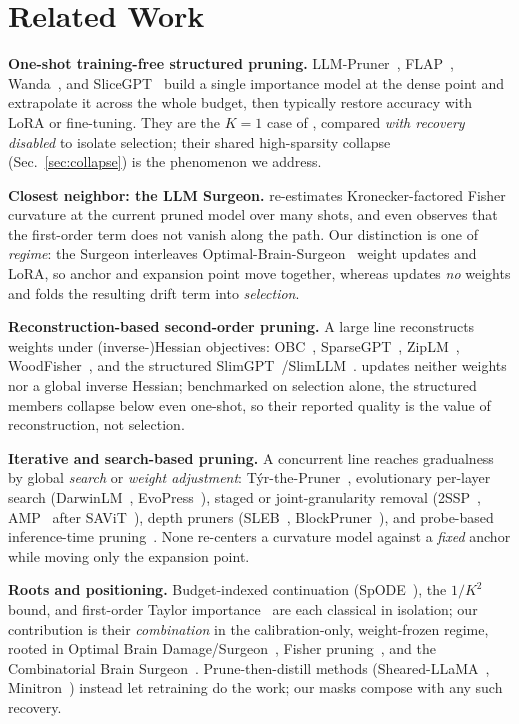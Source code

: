 \section{Related Work}
\label{sec:related}

\textbf{One-shot training-free structured pruning.}
LLM-Pruner~\citep{ma2023llmpruner}, FLAP~\citep{an2024flap}, Wanda~\citep{sun2024wanda}, and SliceGPT~\citep{ashkboos2024slicegpt} build a single importance model at the dense point and extrapolate it across the whole budget, then typically restore accuracy with LoRA or fine-tuning.
They are the $K{=}1$ case of \method, compared \emph{with recovery disabled} to isolate selection; their shared high-sparsity collapse (Sec.~\ref{sec:collapse}) is the phenomenon we address.

\textbf{Closest neighbor: the LLM Surgeon.}
\citet{ouderaa2024llmsurgeon} re-estimates Kronecker-factored Fisher curvature at the current pruned model over many shots, and even observes that the first-order term does not vanish along the path.
Our distinction is one of \emph{regime}: the Surgeon interleaves Optimal-Brain-Surgeon~\citep{hassibi1993obs} weight updates and LoRA, so anchor and expansion point move together, whereas \method updates \emph{no} weights and folds the resulting drift term into \emph{selection}.

\textbf{Reconstruction-based second-order pruning.}
A large line reconstructs weights under (inverse-)Hessian objectives: OBC~\citep{frantar2022obc}, SparseGPT~\citep{frantar2023sparsegpt}, ZipLM~\citep{kurtic2023ziplm}, WoodFisher~\citep{singh2020woodfisher}, and the structured SlimGPT~\citep{ling2024slimgpt}/SlimLLM~\citep{guo2025slimllm}.
\method updates neither weights nor a global inverse Hessian; benchmarked on selection alone, the structured members collapse below even one-shot, so their reported quality is the value of reconstruction, not selection.

\textbf{Iterative and search-based pruning.}
A concurrent line reaches gradualness by global \emph{search} or \emph{weight adjustment}: T\'yr-the-Pruner~\citep{li2025tyr}, evolutionary per-layer search (DarwinLM~\citep{tang2025darwinlm}, EvoPress~\citep{sieberling2025evopress}), staged or joint-granularity removal (2SSP~\citep{sandri2025twossp}, AMP~\citep{mugnaini2025amp} after SAViT~\citep{zheng2022savit}), depth pruners (SLEB~\citep{song2024sleb}, BlockPruner~\citep{zhong2025blockpruner}), and probe-based inference-time pruning~\citep{gong2026subspacepath}.
None re-centers a curvature model against a \emph{fixed} anchor while moving only the expansion point.

\textbf{Roots and positioning.}
Budget-indexed continuation (SpODE~\citep{mo2023spode}), the $1/K^2$ bound, and first-order Taylor importance~\citep{molchanov2019taylor,lee2019snip} are each classical in isolation; our contribution is their \emph{combination} in the calibration-only, weight-frozen regime, rooted in Optimal Brain Damage/Surgeon~\citep{lecun1989obd,hassibi1993obs}, Fisher pruning~\citep{theis2018faster}, and the Combinatorial Brain Surgeon~\citep{yu2022cbs}.
Prune-then-distill methods (Sheared-LLaMA~\citep{xia2024sheared}, Minitron~\citep{muralidharan2024minitron}) instead let retraining do the work; our masks compose with any such recovery.
